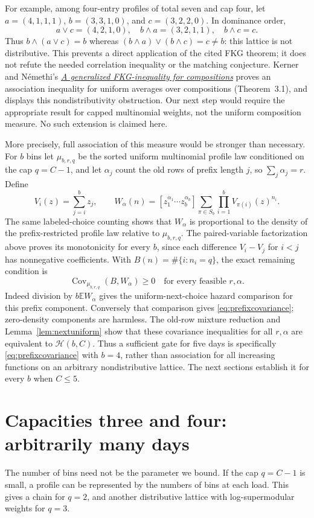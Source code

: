 \documentclass[11pt]{article}
\begin{document}
For example, among four-entry profiles of total seven and cap four,
let $a=(4,1,1,1)$, $b=(3,3,1,0)$, and $c=(3,2,2,0)$.
In dominance order,
\[
 a\vee c=(4,2,1,0),\quad b\wedge a=(3,2,1,1),\quad b\wedge c=c.
\]
Thus $b\wedge(a\vee c)=b$ whereas
$(b\wedge a)\vee(b\wedge c)=c\ne b$: this lattice is not
distributive. This prevents a direct application of the cited FKG
theorem; it does not refute the needed correlation inequality or the
matching conjecture.
Kerner and N\'emethi's
\href{https://arxiv.org/abs/1412.8200}{\emph{A generalized FKG-inequality for compositions}}
proves an association inequality for uniform averages over compositions
(Theorem~3.1), and displays this nondistributivity obstruction.
Our next step would require the appropriate result for capped
multinomial weights, not the uniform composition measure.
No such extension is claimed here.

More precisely, full association of this measure would be stronger
than necessary. For $b$ bins let $\mu_{b,r,q}$ be the sorted uniform
multinomial profile law conditioned on the cap $q=C-1$, and let
$\alpha_j$ count the old rows of prefix length $j$, so
$\sum_j\alpha_j=r$. Define
\[
 V_i(z)=\sum_{j=i}^b z_j,\qquad
 W_\alpha(n)=[z_1^{\alpha_1}\cdots z_b^{\alpha_b}]
             \sum_{\pi\in S_b}\prod_{i=1}^b V_{\pi(i)}(z)^{n_i}.
\]
The same labeled-choice counting shows that $W_\alpha$ is proportional
to the density of the prefix-restricted profile law relative to
$\mu_{b,r,q}$. The paired-variable factorization above proves its
monotonicity for every $b$, since each difference $V_i-V_j$ for $i<j$
has nonnegative coefficients. With $B(n)=\#\{i:n_i=q\}$, the exact
remaining condition is
\begin{equation}\label{eq:prefixcovariance}
 \operatorname{Cov}_{\mu_{b,r,q}}(B,W_\alpha)\geq0
 \quad\text{for every feasible }r,\alpha.
\end{equation}
Indeed division by $b\mathbb E W_\alpha$ gives the uniform-next-choice
hazard comparison for this prefix component. Conversely that comparison
gives \eqref{eq:prefixcovariance}; zero-density components are harmless.
The old-row mixture reduction and Lemma~\ref{lem:nextuniform} show
that these covariance inequalities for all $r,\alpha$ are equivalent
to $\mathcal H(b,C)$. Thus a sufficient gate for five days is specifically
\eqref{eq:prefixcovariance} with $b=4$, rather than association for
all increasing functions on an arbitrary nondistributive lattice.
The next sections establish it for every $b$ when $C\leq5$.

\section{Capacities three and four: arbitrarily many days}
The number of bins need not be the parameter we bound. If the cap
$q=C-1$ is small, a profile can be represented by the numbers of bins
at each load. This gives a chain for $q=2$, and another distributive
lattice with log-supermodular weights for $q=3$.
\end{document}
